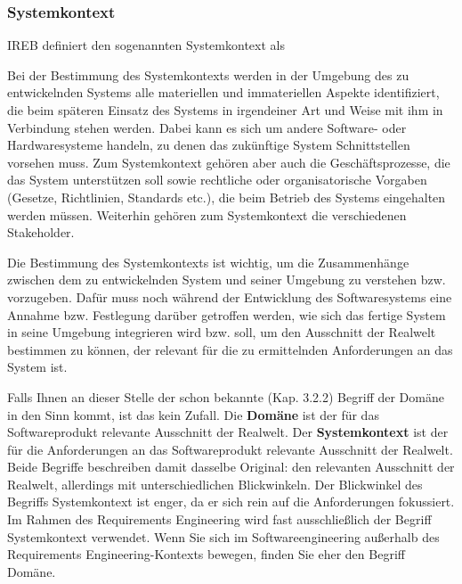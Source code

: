 \subsubsection{Systemkontext}
\label{sec:Kap-6.1.3.1}

IREB definiert den sogenannten Systemkontext als 

\vspace{1mm} %


\vspace{1mm} %

Bei der Bestimmung des Systemkontexts werden in der Umgebung des zu ent\-wickelnden Systems alle materiellen und immateriellen Aspekte identifiziert, die beim späteren Einsatz des Systems in irgendeiner Art und Weise mit ihm in Verbindung stehen werden. Dabei kann es sich um andere Software- oder Hardwaresysteme handeln, zu denen das zukünftige System Schnittstellen vorsehen muss. Zum System\-kontext gehören aber auch die Geschäftsprozesse, die das System unterstützen soll sowie rechtliche oder organisatorische Vorgaben (Gesetze, Richtlinien, Standards etc.), die beim Betrieb des Systems eingehalten werden müssen. Weiterhin gehören zum Systemkontext die verschiedenen Stakeholder. 

Die Bestimmung des Systemkontexts ist wichtig, um die Zusammenhänge zwischen dem zu entwickelnden System und seiner Umgebung zu verstehen bzw. vorzugeben. Dafür muss noch während der Entwicklung des Softwaresystems eine Annahme bzw. Festlegung darüber getroffen werden, wie sich das fertige System in seine Umgebung integrieren wird bzw. soll, um den Ausschnitt der Realwelt bestimmen zu können, der relevant für die zu ermittelnden Anforderungen an das System ist.

Falls Ihnen an dieser Stelle der schon bekannte (Kap. 3.2.2) Begriff der Domäne in den Sinn kommt, ist das kein Zufall.  Die \textbf{Domäne} ist der für das Softwareprodukt relevante Ausschnitt der Realwelt. Der \textbf{Systemkontext} ist der für die Anforderungen an das Softwareprodukt relevante Ausschnitt der Realwelt. Beide Begriffe beschreiben damit dasselbe Original: den relevanten Ausschnitt der Realwelt, allerdings mit unterschiedlichen Blickwinkeln. Der Blickwinkel des Begriffs Systemkontext ist enger, da er sich rein auf die Anforderungen fokussiert. Im Rahmen des Requirements Engineering wird fast ausschließlich der Begriff Systemkontext verwendet. Wenn Sie sich im Softwareengineering außerhalb des Requirements Engineering-Kontexts bewegen, finden Sie eher den Begriff Domäne.

